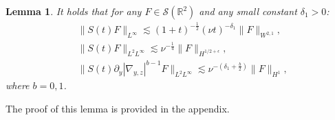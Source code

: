 \documentclass[12pt]{article}
\newtheorem{lemma}{Lemma}[section]
\numberwithin{equation}{section}
\begin{document}
    \begin{lemma}\label{lem-stri}
        It holds that for any $F\in\mathcal{S}(\mathbb{R}^2)$ and any small constant $\delta_1>0$:
        \begin{align}
  			&\|S(t)F\|_{L^\infty}\lesssim(1+t)^{-\frac{1}{2}}(\nu t)^{-\delta_1}\|F\|_{W^{2,1}},\label{est-d1}\\
  			&\|S(t)F\|_{L^2L^\infty}\lesssim\nu^{-\frac{1}{4}}\|F\|_{H^{1/2+\epsilon}},\label{est-d2}\\
  			&\|S(t)\partial_y|\nabla_{y,z}|^{b-1}F\|_{L^2L^\infty}\lesssim\nu^{-(\delta_1+\frac{b}{2})}\|F\|_{H^1},\label{est-d3}
  		\end{align}
    where $b=0,1$.
    \end{lemma}
    The proof of this lemma is provided in the appendix.
\end{document}
